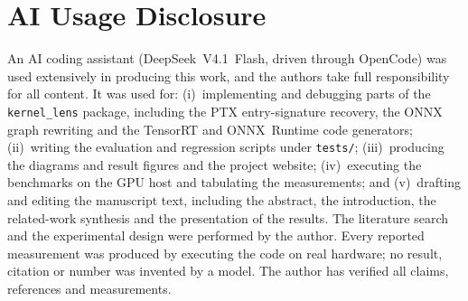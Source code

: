 \documentclass{article}
\begin{document}
\section*{AI Usage Disclosure}

An AI coding assistant (DeepSeek~V4.1~Flash, driven through OpenCode) was used
extensively in producing this work, and the authors take full responsibility
for all content. It was used for: (i)~implementing and debugging parts of the
\texttt{kernel\_lens} package, including the PTX entry-signature recovery, the
ONNX graph rewriting and the TensorRT and ONNX~Runtime code generators;
(ii)~writing the evaluation and regression scripts under \texttt{tests/};
(iii)~producing the diagrams and result figures and the project website;
(iv)~executing the benchmarks on the GPU host and tabulating the measurements;
and (v)~drafting and editing the manuscript text, including the abstract, the
introduction, the related-work synthesis and the presentation of the results.
The literature search and the experimental design were performed by the author.
Every reported measurement was produced by executing the code on real hardware;
no result, citation or number was invented by a model. The author has verified
all claims, references and measurements.
\end{document}
